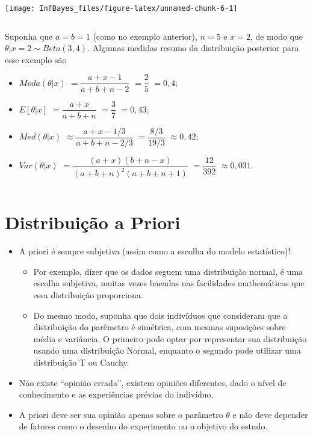 \documentclass[
]{book}
\providecommand{\tightlist}{%
  \setlength{\itemsep}{0pt}\setlength{\parskip}{0pt}}
\begin{document}
\(~\)

\begin{center}\texttt{[image: InfBayes\_files/figure-latex/unnamed-chunk-6-1]} \end{center}

\(~\)

Suponha que \(a=b=1\) (como no exemplo anterior), \(n=5\) e \(x=2\), de modo que \(\theta|x=2 \sim Beta(3,4)\). Algumas medidas resumo da distribuição posterior para esse exemplo são

\begin{itemize}
\item
  \(Moda(\theta|x)\) \(=\dfrac{a+x-1}{a+b+n-2}\) \(=\dfrac{2}{5}\) \(=0,4\);
\item
  \(E[\theta|x]\) \(=\dfrac{a+x}{a+b+n}\) \(=\dfrac{3}{7}\) \(=0,43\);
\item
  \(Med(\theta|x)\) \(\approx \dfrac{a+x-1/3}{a+b+n-2/3}\) \(=\dfrac{8/3}{19/3}\) \(\approx 0,42\);
\item
  \(Var(\theta|x)\) \(=\dfrac{(a+x)(b+n-x)}{(a+b+n)^2(a+b+n+1)}\) \(=\dfrac{12}{392}\) \(\approx 0,031\).
\end{itemize}

\(~\)

\hypertarget{distribuiuxe7uxe3o-a-priori}{%
\section{Distribuição a Priori}\label{distribuiuxe7uxe3o-a-priori}}

\begin{itemize}
\tightlist
\item
  A priori é sempre subjetiva (assim como a escolha do modelo estatístico)!

  \begin{itemize}
  \tightlist
  \item
    Por exemplo, dizer que os dados seguem uma distribuição normal, é uma escolha subjetiva, muitas vezes baeadas nas facilidades mathemáticas que essa distribuição proporciona.\\
  \item
    Do mesmo modo, suponha que dois indivíduos que consideram que a distribuição do parêmetro é simétrica, com mesmas suposições sobre média e variância. O primeiro pode optar por representar sua distribuição usando uma distribuição Normal, enquanto o segundo pode utilizar uma distribuição T ou Cauchy.\\
  \end{itemize}
\item
  Não existe ``opinião errada'', existem opiniões diferentes, dado o nível de conhecimento e as experiências prévias do indivíduo.\\
\item
  A priori deve ser sua opinião apenas sobre o parâmetro \(\theta\) e não deve depender de fatores como o desenho do experimento ou o objetivo do estudo.
\end{itemize}
\end{document}

